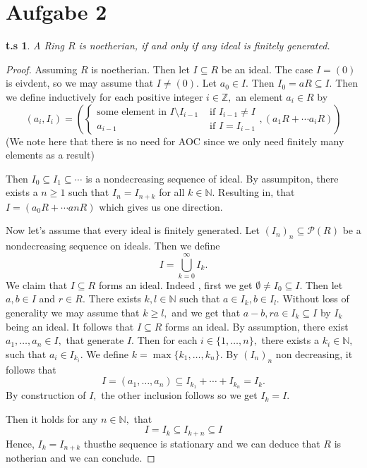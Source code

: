 \documentclass[10pt,a4paper]{article}
\newtheorem*{zz*}{t.s}
\newcommand{\ZZ}{\mathbb{Z}}
\newcommand{\NN}{\mathbb{N}}
\begin{document}
	\section*{Aufgabe 2}
	\begin{zz*}
		A Ring $R$ is noetherian, if and only if any ideal is finitely generated.
	\end{zz*}
	\begin{proof}
		Assuming $R$ is noetherian. Then let $I\subseteq R$ be an ideal. The case $I = (0)$ is eivdent, so we may assume that $I\neq (0).$ Let $a_0\in I.$ Then $I_0 = aR\subseteq I.$ Then we define inductively for each positive integer $i\in \ZZ,$ an element $a_i\in R$ by
		\[(a_i, I_{i})= \left(\begin{cases}
			\text{some element in } I\setminus I_{i-1} & \text{ if } I_{i-1}\neq I\\
			a_{i-1} & \text{ if } I = I_{i-1}
		\end{cases}, (a_1R+\cdots a_{i}R)\right)\]
		(We note here that there is no need for AOC since we only need finitely many elements as a result)
		
		Then $I_0\subseteq I_{1}\subseteq \cdots$ is a nondecreasing sequence of ideal. By assumpiton, there exists a $n\geq 1$ such that $I_{n} = I_{n+k}$ for all $k\in \NN.$ Resulting in, that $I = (a_0R+\cdots anR)$ which gives us one direction.
		
		Now let's assume that every ideal is finitely generated. Let $(I_n)_n\subseteq \mathcal{P}(R)$ be a nondecreasing sequence on ideals. Then we define
		\[I = \bigcup_{k=0}^\infty I_k.\]
		We claim that $I\subseteq R$ forms an ideal. Indeed , first we get $\emptyset\neq I_0\subseteq I.$ Then let $a,b\in I$ and $r\in R.$ There exists $k,l\in \NN$ such that $a\in I_k,b\in I_l.$ Without loss of generality we may assume that $k\geq l,$ and we get that $a-b,ra\in I_k\subseteq I$ by $I_k$ being an ideal. It follows that $I\subseteq R$ forms an ideal. By assumption, there exist $a_1,\dots, a_n\in I,$ that generate $I.$ Then for each $i\in \{1,\dots, n\},$ there exists a $k_i\in \NN,$ such that $a_i\in I_{k_i}.$ We define $k = \max\{k_1,\dots, k_n\}.$ By $(I_n)_n$ non decreasing, it follows that
		\[I= (a_1,\dots, a_n) \subseteq I_{k_1}+\cdots + I_{k_n} = I_k.\]
		By construction of $I,$ the other inclusion follows so we get $I_k = I.$
		
		Then it holds for any $n\in \NN,$ that 
		\[I = I_k\subseteq I_{k+n} \subseteq I\]
		Hence, $I_k = I_{n+k}$ thusthe sequence is stationary and we can deduce that $R$ is notherian and we can conclude.
	\end{proof}
	\pagebreak
\end{document}
